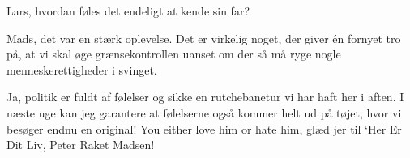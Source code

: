 \documentclass[a4paper,11pt]{article}
\begin{document}
\begin{sketch}
 Lars, hvordan føles det endeligt at kende sin far?

  Mads, det var en stærk oplevelse. Det er virkelig noget, der giver én fornyet tro på, at vi skal øge grænsekontrollen uanset om der så må ryge nogle menneskerettigheder i svinget.


 Ja, politik er fuldt af følelser og sikke en rutchebanetur vi har haft her i aften. I næste uge kan jeg garantere at følelserne også kommer helt ud på tøjet, hvor vi besøger endnu en original! You either love him or hate him, glæd jer til ‘Her Er Dit Liv, Peter Raket Madsen!



\end{sketch}
\end{document}
